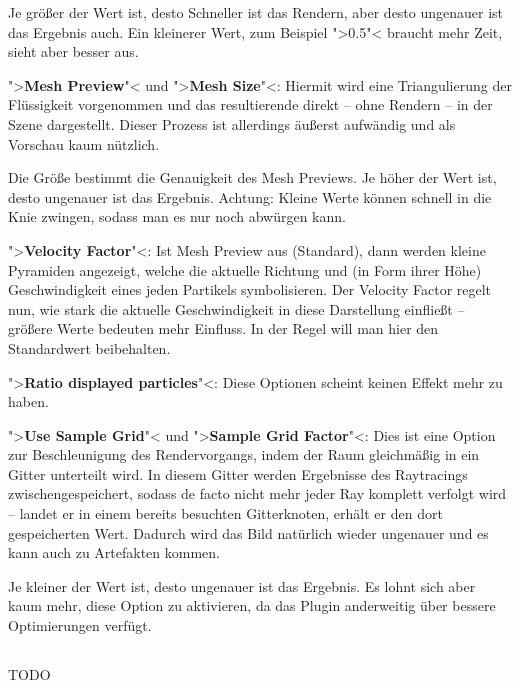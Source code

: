 \documentclass[10pt,DIV=14,a4paper]{scrartcl}
\begin{document}
	Je größer der Wert ist, desto Schneller ist das Rendern, aber desto
	ungenauer ist das Ergebnis auch. Ein kleinerer Wert, zum Beispiel
	">0.5"< braucht mehr Zeit, sieht aber besser aus.

	\item ">\textbf{Mesh Preview}"< und ">\textbf{Mesh Size}"<: Hiermit
	wird eine Triangulierung der Flüssigkeit vorgenommen und das
	resultierende \TriMesh direkt -- ohne Rendern -- in der Szene
	dargestellt. Dieser Prozess ist allerdings äußerst aufwändig und als
	Vorschau kaum nützlich.

	Die Größe bestimmt die Genauigkeit des Mesh Previews. Je höher der
	Wert ist, desto ungenauer ist das Ergebnis. Achtung: Kleine Werte
	können \aoi schnell in die Knie zwingen, sodass man es nur noch
	abwürgen kann.

	\item ">\textbf{Velocity Factor}"<: Ist Mesh Preview aus (Standard),
	dann werden kleine Pyramiden angezeigt, welche die aktuelle Richtung
	und (in Form ihrer Höhe) Geschwindigkeit eines jeden Partikels
	symbolisieren. Der Velocity Factor regelt nun, wie stark die
	aktuelle Geschwindigkeit in diese Darstellung einfließt -- größere
	Werte bedeuten mehr Einfluss. In der Regel will man hier den
	Standardwert beibehalten.

	\item ">\textbf{Ratio displayed particles}"<: Diese Optionen scheint
	keinen Effekt mehr zu haben.

	\item ">\textbf{Use Sample Grid}"< und ">\textbf{Sample Grid
	Factor}"<: Dies ist eine Option zur Beschleunigung des
	Rendervorgangs, indem der Raum gleichmäßig in ein Gitter unterteilt
	wird. In diesem Gitter werden Ergebnisse des Raytracings
	zwischengespeichert, sodass de facto nicht mehr jeder Ray komplett
	verfolgt wird -- landet er in einem bereits besuchten Gitterknoten,
	erhält er den dort gespeicherten Wert. Dadurch wird das Bild
	natürlich wieder ungenauer und es kann auch zu Artefakten kommen.

	Je kleiner der Wert ist, desto ungenauer ist das Ergebnis. Es lohnt
	sich aber kaum mehr, diese Option zu aktivieren, da das Plugin
	anderweitig über bessere Optimierungen verfügt.

\itE

\subsection{}
TODO
\end{document}
